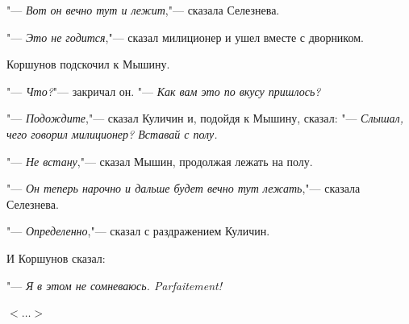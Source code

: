 "--- \textit{Вот он вечно тут и лежит},"--- сказала Селезнева.

"--- \textit{Это не годится},"--- сказал милиционер и ушел вместе с дворником.

Коршунов подскочил к Мышину.

"--- \textit{Что?}"--- закричал он. "--- \textit{Как вам это по вкусу пришлось?}

"--- \textit{Подождите},"--- сказал Куличин и, подойдя к Мышину, сказал: "--- \textit{Слышал, чего говорил милиционер? Вставай с полу.}

"--- \textit{Не встану},"--- сказал Мышин, продолжая лежать на полу.

"--- \textit{Он теперь нарочно и дальше будет вечно тут лежать},"--- сказала Селезнева.

"--- \textit{Определенно},"--- сказал с раздражением Куличин.

И Коршунов сказал:

"--- \textit{Я в этом не сомневаюсь. Parfaitement!}

\begin{flushright}
	$<\dots>$
\end{flushright}